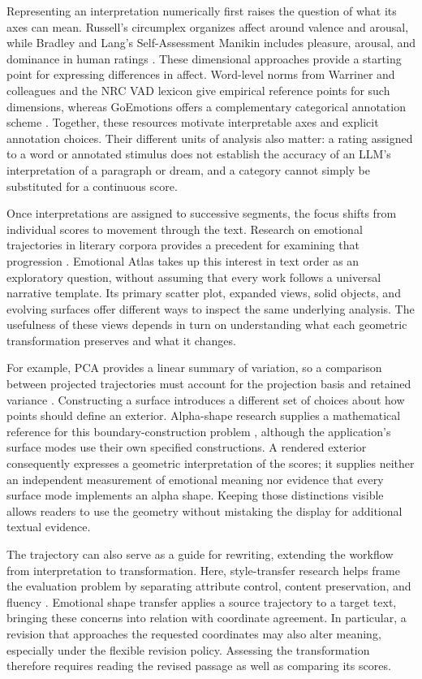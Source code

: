 \documentclass[manuscript,screen,nonacm]{acmart}
\begin{document}
Representing an interpretation numerically first raises the question of what its axes can mean. Russell's circumplex organizes affect around valence and arousal, while Bradley and Lang's Self-Assessment Manikin includes pleasure, arousal, and dominance in human ratings \cite{russell,sam}. These dimensional approaches provide a starting point for expressing differences in affect. Word-level norms from Warriner and colleagues and the NRC VAD lexicon give empirical reference points for such dimensions, whereas GoEmotions offers a complementary categorical annotation scheme \cite{warriner,vad,goemotions}. Together, these resources motivate interpretable axes and explicit annotation choices. Their different units of analysis also matter: a rating assigned to a word or annotated stimulus does not establish the accuracy of an LLM's interpretation of a paragraph or dream, and a category cannot simply be substituted for a continuous score.

Once interpretations are assigned to successive segments, the focus shifts from individual scores to movement through the text. Research on emotional trajectories in literary corpora provides a precedent for examining that progression \cite{arcs}. Emotional Atlas takes up this interest in text order as an exploratory question, without assuming that every work follows a universal narrative template. Its primary scatter plot, expanded views, solid objects, and evolving surfaces offer different ways to inspect the same underlying analysis. The usefulness of these views depends in turn on understanding what each geometric transformation preserves and what it changes.

For example, PCA provides a linear summary of variation, so a comparison between projected trajectories must account for the projection basis and retained variance \cite{pca}. Constructing a surface introduces a different set of choices about how points should define an exterior. Alpha-shape research supplies a mathematical reference for this boundary-construction problem \cite{alphashapes}, although the application's surface modes use their own specified constructions. A rendered exterior consequently expresses a geometric interpretation of the scores; it supplies neither an independent measurement of emotional meaning nor evidence that every surface mode implements an alpha shape. Keeping those distinctions visible allows readers to use the geometry without mistaking the display for additional textual evidence.

The trajectory can also serve as a guide for rewriting, extending the workflow from interpretation to transformation. Here, style-transfer research helps frame the evaluation problem by separating attribute control, content preservation, and fluency \cite{style}. Emotional shape transfer applies a source trajectory to a target text, bringing these concerns into relation with coordinate agreement. In particular, a revision that approaches the requested coordinates may also alter meaning, especially under the flexible revision policy. Assessing the transformation therefore requires reading the revised passage as well as comparing its scores.
\end{document}
